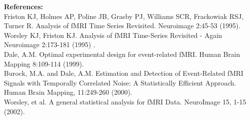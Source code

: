 \documentclass{article}
\begin{document}
\noindent
{\bf References:}\\

\noindent
Friston KJ, Holmes AP, Poline JB, Grasby PJ, Williams SCR, Frackowiak
RSJ, Turner R. Analysis of fMRI Time Series Revisited. Neuroimage
2:45-53  (1995).\\

\noindent
Worsley KJ, Friston KJ. Analysis of fMRI Time-Series Revisited - Again 
Neuroimage 2:173-181 (1995) .\\

\noindent
Dale, A.M. Optimal experimental design for event-related
fMRI. Human Brain Mapping 8:109-114 (1999).\\

\noindent
Burock, M.A. and Dale, A.M. Estimation and Detection of Event-Related
fMRI Signals with Temporally Correlated Noise: A Statistically
Efficient Approach. Human Brain Mapping, 11:249-260 (2000).\\

\noindent
Worsley, et al. A general statistical analysis for fMRI
Data. NeuroImage 15, 1-15 (2002). \\
\end{document}
